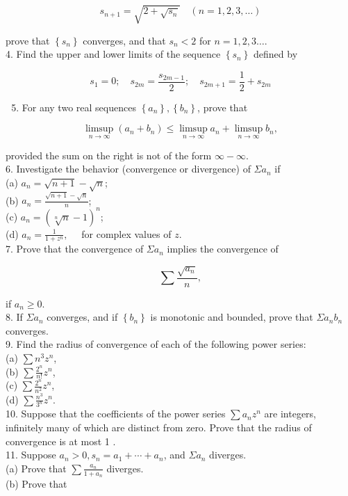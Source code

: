 \documentclass[10pt]{article}
\begin{document}
$$
s_{n+1}=\sqrt{2+\sqrt{s_{n}}} \quad(n=1,2,3, \ldots)
$$

prove that $\left\{s_{n}\right\}$ converges, and that $s_{n}<2$ for $n=1,2,3 \ldots$.\\
4. Find the upper and lower limits of the sequence $\left\{s_{n}\right\}$ defined by

$$
s_{1}=0 ; \quad s_{2 m}=\frac{s_{2 m-1}}{2} ; \quad s_{2 m+1}=\frac{1}{2}+s_{2 m}
$$

\begin{enumerate}
  \setcounter{enumi}{4}
  \item For any two real sequences $\left\{a_{n}\right\},\left\{b_{n}\right\}$, prove that
\end{enumerate}

$$
\limsup _{n \rightarrow \infty}\left(a_{n}+b_{n}\right) \leq \limsup _{n \rightarrow \infty} a_{n}+\limsup _{n \rightarrow \infty} b_{n},
$$

provided the sum on the right is not of the form $\infty-\infty$.\\
6. Investigate the behavior (convergence or divergence) of $\Sigma a_{n}$ if\\
(a) $a_{n}=\sqrt{n+1}-\sqrt{n}$;\\
(b) $a_{n}=\frac{\sqrt{n+1}-\sqrt{n}}{n}$;\\
(c) $a_{n}=(\sqrt[n]{n}-1)^{n}$;\\
(d) $a_{n}=\frac{1}{1+z^{n}}, \quad$ for complex values of $z$.\\
7. Prove that the convergence of $\Sigma a_{n}$ implies the convergence of

$$
\sum \frac{\sqrt{a_{n}}}{n},
$$

if $a_{n} \geq 0$.\\
8. If $\Sigma a_{n}$ converges, and if $\left\{b_{n}\right\}$ is monotonic and bounded, prove that $\Sigma a_{n} b_{n}$ converges.\\
9. Find the radius of convergence of each of the following power series:\\
(a) $\sum n^{3} z^{n}$,\\
(b) $\sum \frac{2^{n}}{n!} z^{n}$,\\
(c) $\sum \frac{2^{n}}{n^{2}} z^{n}$,\\
(d) $\sum \frac{n^{3}}{3^{n}} z^{n}$.\\
10. Suppose that the coefficients of the power series $\sum a_{n} z^{n}$ are integers, infinitely many of which are distinct from zero. Prove that the radius of convergence is at most 1 .\\
11. Suppose $a_{n}>0, s_{n}=a_{1}+\cdots+a_{n}$, and $\Sigma a_{n}$ diverges.\\
(a) Prove that $\sum \frac{a_{n}}{1+a_{n}}$ diverges.\\
(b) Prove that
\end{document}
